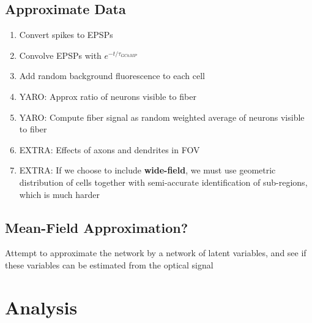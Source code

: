 \documentclass[10pt,a4paper,draft]{article}
\begin{document}
\subsection{Approximate Data}

\begin{enumerate}
  \item Convert spikes to EPSPs
  \item Convolve EPSPs with $e^{-t/\tau_{GCaMP}}$
  \item Add random background fluorescence to each cell
  \item YARO: Approx ratio of neurons visible to fiber
  \item YARO: Compute fiber signal as random weighted average of neurons visible to fiber
  \item EXTRA: Effects of axons and dendrites in FOV
  \item EXTRA: If we choose to include \textbf{wide-field}, we must use geometric distribution of cells together with semi-accurate identification of sub-regions, which is much harder
\end{enumerate}

\subsection{Mean-Field Approximation?}

Attempt to approximate the network by a network of latent variables, and see if these variables can be estimated from the optical signal


\section{Analysis}
\end{document}
